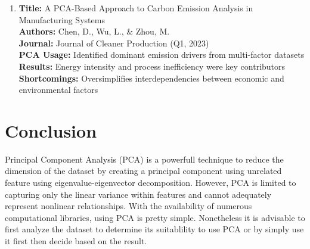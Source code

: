\documentclass[a4paper,12pt]{article}
\begin{document}
\begin{enumerate}[leftmargin=*]
\item \textbf{Title:} A PCA-Based Approach to Carbon Emission Analysis in Manufacturing Systems  \\
\textbf{Authors:} Chen, D., Wu, L., \& Zhou, M.  \\
\textbf{Journal:} Journal of Cleaner Production (Q1, 2023)  \\
\textbf{PCA Usage:} Identified dominant emission drivers from multi-factor datasets  \\
\textbf{Results:} Energy intensity and process inefficiency were key contributors  \\
\textbf{Shortcomings:} Oversimplifies interdependencies between economic and environmental factors  \\

\end{enumerate}

\section{Conclusion}
Principal Component Analysis (PCA) is a powerfull technique to reduce the dimension of the dataset by creating a principal component using unrelated feature
using eigenvalue-eigenvector decomposition. However, PCA is limited to capturing only the linear variance within features and cannot adequately represent nonlinear relationships.
With the availability of numerous computational libraries, using PCA is pretty simple. 
Nonetheless it is advisable to first analyze the dataset to determine its suitablility to use PCA or by simply use it first then decide based on the result.



\end{document}
